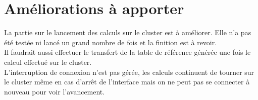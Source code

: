 \documentclass[12pt,a4paper]{article}
\begin{document}
\section{Améliorations à apporter}
    La partie sur le lancement des calculs sur le cluster est à améliorer. Elle
    n'a pas été testée ni lancé un grand nombre de fois et la finition est à
    revoir.\\
    
    Il faudrait aussi effectuer le transfert de la table de référence
    générée une fois le calcul effectué sur le cluster.\\
    
    L'interruption de
    connexion n'est pas gérée, les calculs continuent de tourner sur le cluster
    même en cas d'arrêt de l'interface mais on ne peut pas se connecter à
    nouveau pour voir l'avancement.
\end{document}
